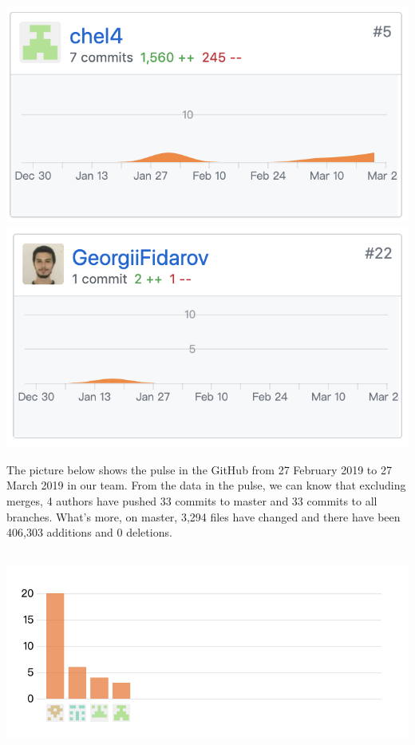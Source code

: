 \documentclass{article}
\begin{document}
\begin{minipage}
\includegraphics[scale=0.5]{Lili.png}
\includegraphics[scale=0.5]{georgii.png}
\label{fig:contribution in each team members}
\end{minipage}

The picture below shows the pulse in the GitHub from 27 February 2019 to 27 March 2019 in our team. From the data in the pulse, we can know that excluding merges, 4 authors have pushed 33 commits to master and 33 commits to all branches. What’s more, on master, 3,294 files have changed and there have been 406,303 additions and 0 deletions.\\\\

\begin{minipage}
\centering
\includegraphics[scale=0.5]{pulse.png}
\label{fig:number of pulse}
\end{minipage}
\end{document}
